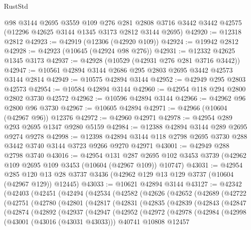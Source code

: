 \begin{lexlean}{RustStd}
\begin{coremodule}
    @98
    @3144
    @2695
    @3559
    @109
    @276
    @281
    @2808
    @3716
    @3442
    @3442
    @42575
    (@12296 @42625 @3144 @1345 @3173 @2812 @3144 @2695)
@42920 := @12318 @2812
@42923 := @42919 (@12306 (@42920 @109))
@42924 := @19942 @2812
@42928 := @42923 (@10645 (@42924 @98 @276))
@42931 := @12332 @42625 @1345 @3173
@42937 := @42928 (@10529 (@42931 @276 @281 @3716 @3442))
@42947 := @10561 @42894 @3144 @2686 @295 @2803 @2695 @3442 @42573 @3144 @2814
@42949 := @10575 @42894 @3144
@42952 := @42949 @295 @2803 @42573
@42954 := @10584 @42894 @3144
@42960 := @42954 @118 @294 @2800 @2802 @3730 @42572
@42962 := @10596 @42894 @3144
@42966 := @42962 @96 @2800 @96 @3730
@42967 := @10605 @42894
@42971 := @42966 (@10604 (@42967 @96)) @12376
@42972 := @42960 @42971
@42978 := @42954 @289 @293 @2695 @1347 @9280 @5159
@42984 := @12388 @42894 @3144 @289 @2695 @9274 @9278
@42998 := @12398 @42894 @3144 @118 @2798 @2695 @3730 @288 @3442 @3740 @3144 @3723 @9266 @9270 @42971
@43001 := @42949 @288 @2798 @3740
@43016 := @42954
    @131
    @287
    @2695
    @102
    @3453
    @3739
    (@42962 @109 @2695 @109 @3453 (@10604 (@42967 @109)) @10747)
@43031 := @42954
    @285
    @120
    @13
    @28
    @3737
    @3436
    (@42962 @129 @13 @129 @3737 (@10604 (@42967 @129)) @12445)
@43033 := @10621 @42894 @3144
@43127 := @42342
    (@42403
      (@42451
        (@42494
          (@42534
            (@42582
              (@42626
                (@42652
                  (@42689
                    (@42722
                      (@42751
                        (@42780
                          (@42801
                            (@42817
                              (@42831
                                (@42835
                                  (@42839
                                    (@42843
                                      (@42847
                                        (@42874
                                          (@42892
                                            (@42937
                                              (@42947
                                                (@42952
                                                  (@42972
                                                    (@42978
                                                      (@42984
                                                        (@42998
                                                          (@43001 (@43016 (@43031 @43033)))
                                                          @40741
                                                          @10808
                                                          @12457

\end{coremodule}
\end{lexlean}
